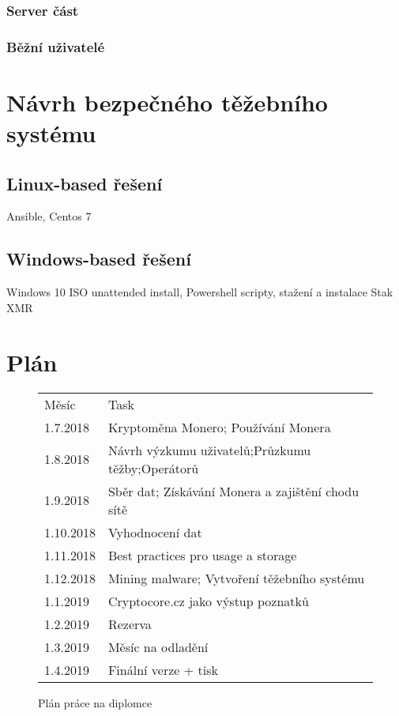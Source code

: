 \documentclass[
  printed, %
  table,   %
  nolof,     %
  nolot,     %
           oneside, color
]{fithesis3}
\begin{document}
\subsection{Server část}
\subsection{Běžní uživatelé}


\chapter{Návrh bezpečného těžebního systému}
\section{Linux-based řešení}
Ansible, Centos 7
\section{Windows-based řešení}
Windows 10 ISO unattended install, Powershell scripty, stažení a instalace Stak XMR

\chapter{Plán}

\begin{figure}[H]
\center
\begin{tabular}{ll}
Měsíc     & Task                                              \\
1.7.2018  & Kryptoměna Monero; Používání Monera               \\
1.8.2018  & Návrh výzkumu uživatelů;Průzkumu těžby;Operátorů  \\
1.9.2018  & Sběr dat; Získávání Monera a zajištění chodu sítě \\
1.10.2018 & Vyhodnocení dat                                   \\
1.11.2018 & Best practices pro usage a storage                \\
1.12.2018 & Mining malware; Vytvoření těžebního systému       \\
1.1.2019  & Cryptocore.cz jako výstup poznatků                \\
1.2.2019  & Rezerva                                           \\
1.3.2019  & Měsíc na odladění                                 \\
1.4.2019  & Finální verze + tisk                             
\end{tabular}
\caption{Plán práce na diplomce}
\label{ssme-thesis-plan}
\end{figure}
\end{document}
